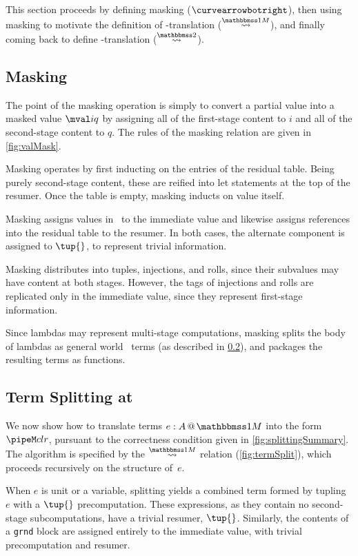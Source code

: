 \begin{abstrsyn}
This section proceeds by defining masking ($\vsplito$), 
then using masking to motivate the definition of \bbonem-translation ($\splitonesym$),
and finally coming back to define \bbtwo-translation ($\splittwosym$).

\subsection{Masking}

The point of the masking operation is simply to convert a partial value into a masked value $\mval i q$
by assigning all of the first-stage content to $i$ and all of the second-stage content to $q$.
The rules of the masking relation are given in \ref{fig:valMask}.

Masking operates by first inducting on the entries of the residual table.  
Being purely second-stage content, these are reified into let statements at the top of the resumer.
Once the table is empty, masking inducts on value itself.

Masking assigns values in \bbonep\ to the immediate value
and likewise assigns references into the residual table to the resumer.
In both cases, the alternate component is assigned to $\tup{}$, to represent trivial information.

Masking distributes into tuples, injections, and rolls, since their subvalues may have content at both stages.
However, the tags of injections and rolls are replicated only in the immediate value, 
since they represent first-stage information.

Since lambdas may represent multi-stage computations, 
masking splits the body of lambdas as general world \bbonem\ terms (as described in \ref{sec:split-one}), 
and packages the resulting terms as functions.

\subsection{Term Splitting at \bbonem}
\label{sec:split-one}

We now show how to translate terms $\colmix e A$ into the form $\pipeM c l r$,
pursuant to the correctness condition given in \ref{fig:splittingSummary}.
The algorithm is specified by the $\splitonesym$ relation (\cref{fig:termSplit}), 
which proceeds recursively on the structure of~$e$.

When $e$ is unit or a variable,
splitting yields a combined term formed by tupling $e$ with a $\tup{}$ precomputation.
These expressions, as they contain no second-stage subcomputations, have a trivial resumer, $\tup{}$.
Similarly, the contents of a \texttt{grnd} block are assigned entirely to the immediate value,
with trivial precomputation and resumer.


\end{abstrsyn}
